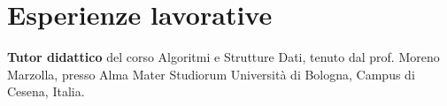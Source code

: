 \documentclass[curriculum-vitae-ita]{subfiles}
\begin{document}
	\section*{Esperienze lavorative}
	 \textbf{Tutor didattico} del corso Algoritmi e Strutture Dati, tenuto dal prof. Moreno Marzolla, presso Alma Mater Studiorum Università di Bologna, Campus di Cesena, Italia.
\end{document}
